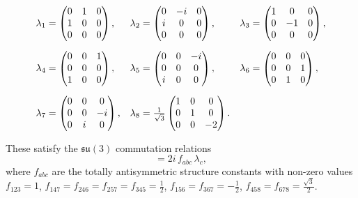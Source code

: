 \documentclass[12pt,a4paper]{article}
\theoremstyle{definition}
\theoremstyle{remark}
\begin{document}
\begin{align}
  \lambda_1 &= \begin{pmatrix} 0 & 1 & 0 \\ 1 & 0 & 0 \\ 0 & 0 & 0 \end{pmatrix},
  &\lambda_2 &= \begin{pmatrix} 0 & -i & 0 \\ i & 0 & 0 \\ 0 & 0 & 0 \end{pmatrix},
  &\lambda_3 &= \begin{pmatrix} 1 & 0 & 0 \\ 0 & -1 & 0 \\ 0 & 0 & 0 \end{pmatrix}, \notag \\[6pt]
  \lambda_4 &= \begin{pmatrix} 0 & 0 & 1 \\ 0 & 0 & 0 \\ 1 & 0 & 0 \end{pmatrix},
  &\lambda_5 &= \begin{pmatrix} 0 & 0 & -i \\ 0 & 0 & 0 \\ i & 0 & 0 \end{pmatrix},
  &\lambda_6 &= \begin{pmatrix} 0 & 0 & 0 \\ 0 & 0 & 1 \\ 0 & 1 & 0 \end{pmatrix}, \notag \\[6pt]
  \lambda_7 &= \begin{pmatrix} 0 & 0 & 0 \\ 0 & 0 & -i \\ 0 & i & 0 \end{pmatrix},
  &\lambda_8 &= \tfrac{1}{\sqrt{3}}\begin{pmatrix} 1 & 0 & 0 \\ 0 & 1 & 0 \\ 0 & 0 & -2 \end{pmatrix}. \label{eq:gell_mann}
\end{align}

These satisfy the $\mathfrak{su}(3)$ commutation relations
\begin{equation}
  [\lambda_a, \lambda_b] = 2i\, f_{abc}\, \lambda_c,
  \label{eq:comm_rel}
\end{equation}
where $f_{abc}$ are the totally antisymmetric structure constants with
non-zero values $f_{123} = 1$, $f_{147} = f_{246} = f_{257} =
f_{345} = \tfrac{1}{2}$, $f_{156} = f_{367} = -\tfrac{1}{2}$,
$f_{458} = f_{678} = \tfrac{\sqrt{3}}{2}$.
\end{document}
